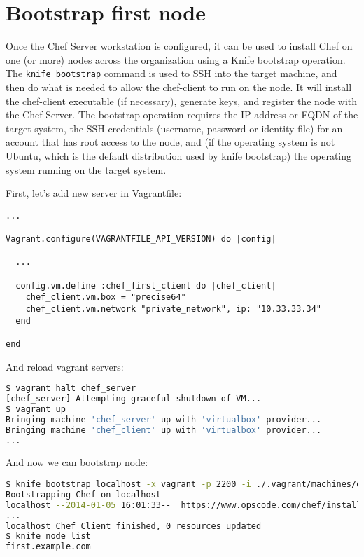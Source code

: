 \section{Bootstrap first node}
\label{sec:server-node}

Once the Chef Server workstation is configured, it can be used to install Chef on one (or more) nodes across the organization using a Knife bootstrap operation. The \lstinline!knife bootstrap! command is used to SSH into the target machine, and then do what is needed to allow the chef-client to run on the node. It will install the chef-client executable (if necessary), generate keys, and register the node with the Chef Server. The bootstrap operation requires the IP address or FQDN of the target system, the SSH credentials (username, password or identity file) for an account that has root access to the node, and (if the operating system is not Ubuntu, which is the default distribution used by knife bootstrap) the operating system running on the target system.

First, let's add new server in Vagrantfile:

\begin{lstlisting}[label=lst:my-server-cloud-node1,title=my-server-cloud/Vagrantfile]
...

Vagrant.configure(VAGRANTFILE_API_VERSION) do |config|

  ...

  config.vm.define :chef_first_client do |chef_client|
    chef_client.vm.box = "precise64"
    chef_client.vm.network "private_network", ip: "10.33.33.34"
  end

end
\end{lstlisting}

And reload vagrant servers:

\begin{lstlisting}[language=Bash,label=lst:my-server-cloud-node2]
$ vagrant halt chef_server
[chef_server] Attempting graceful shutdown of VM...
$ vagrant up
Bringing machine 'chef_server' up with 'virtualbox' provider...
Bringing machine 'chef_client' up with 'virtualbox' provider...
...
\end{lstlisting}

And now we can bootstrap node:

\begin{lstlisting}[language=Bash,label=lst:my-server-cloud-node3]
$ knife bootstrap localhost -x vagrant -p 2200 -i ./.vagrant/machines/default/virtualbox/private_key -N first.example.com --sudo
Bootstrapping Chef on localhost
localhost --2014-01-05 16:01:33--  https://www.opscode.com/chef/install.sh
...
localhost Chef Client finished, 0 resources updated
$ knife node list
first.example.com
\end{lstlisting}

